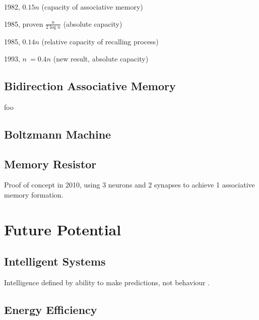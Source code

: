 \documentclass[12pt, a4paper]{article}
\begin{document}

1982, $0.15n$ (capacity of associative memory)


1985, proven $ \frac{n}{2\log{n}} $ (absolute capacity)

1985, $0.14n$ (relative capacity of recalling process)

1993, $ n ~= 0.4n $ (new result, absolute capacity)

\subsection{Bidirection Associative Memory}


foo

\subsection{Boltzmann Machine}



\subsection{Memory Resistor}


Proof of concept in 2010, using 3 neurons and 2 synapses to achieve 1 associative memory formation.


\section{Future Potential}

\subsection{Intelligent Systems}

Intelligence defined by ability to make predictions, not behaviour \cite{intelligence_is_prediction}.

\subsection{Energy Efficiency}
\end{document}
